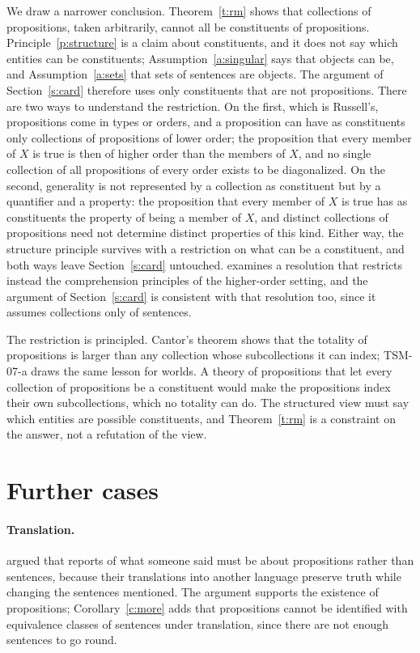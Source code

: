 \documentclass{situationist-preprint}
\begin{document}
We draw a narrower conclusion. Theorem~\ref{t:rm} shows that collections of propositions, taken arbitrarily, cannot all be constituents of propositions. Principle~\ref{p:structure} is a claim about constituents, and it does not say which entities can be constituents; Assumption~\ref{a:singular} says that objects can be, and Assumption~\ref{a:sets} that sets of sentences are objects. The argument of Section~\ref{s:card} therefore uses only constituents that are not propositions. There are two ways to understand the restriction. On the first, which is Russell's, propositions come in types or orders, and a proposition can have as constituents only collections of propositions of lower order; the proposition that every member of $X$ is true is then of higher order than the members of $X$, and no single collection of all propositions of every order exists to be diagonalized. On the second, generality is not represented by a collection as constituent but by a quantifier and a property: the proposition that every member of $X$ is true has as constituents the property of being a member of $X$, and distinct collections of propositions need not determine distinct properties of this kind. Either way, the structure principle survives with a restriction on what can be a constituent, and both ways leave Section~\ref{s:card} untouched. \citet{Uzquiano2015} examines a resolution that restricts instead the comprehension principles of the higher-order setting, and the argument of Section~\ref{s:card} is consistent with that resolution too, since it assumes collections only of sentences.

The restriction is principled. Cantor's theorem shows that the totality of propositions is larger than any collection whose subcollections it can index; TSM-07-a draws the same lesson for worlds. A theory of propositions that let every collection of propositions be a constituent would make the propositions index their own subcollections, which no totality can do. The structured view must say which entities are possible constituents, and Theorem~\ref{t:rm} is a constraint on the answer, not a refutation of the view.

\section{Further cases}\label{s:cases}

\paragraph{Translation.} \citet{Church1950} argued that reports of what someone said must be about propositions rather than sentences, because their translations into another language preserve truth while changing the sentences mentioned. The argument supports the existence of propositions; Corollary~\ref{c:more} adds that propositions cannot be identified with equivalence classes of sentences under translation, since there are not enough sentences to go round.
\end{document}
